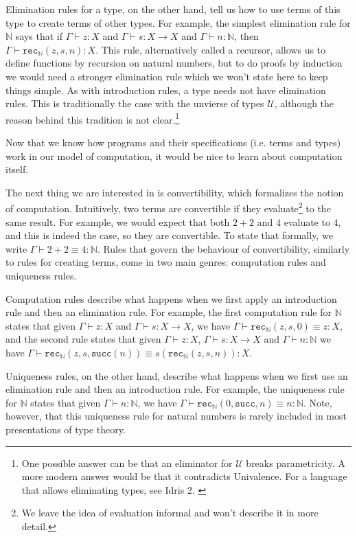 \documentclass[declaration,mgr,english,shortabstract]{iithesis}
\newcommand{\m}[1]{\texttt{#1}}
\newcommand{\term}[3]{#1 \vdash #2 : #3}
\newcommand{\termconv}[4]{#1 \vdash #2 \equiv #3 : #4}
\newcommand{\N}{\mathbb{N}}
\newcommand{\suc}[1]{\m{succ}(#1)}
\newcommand{\recN}[3]{\m{rec}_\N(#1, #2, #3)}
\begin{document}
Elimination rules for a type, on the other hand, tell us how to use terms of this type to create terms of other types. For example, the simplest elimination rule for $\N$ says that if $\term{\Gamma}{z}{X}$ and $\term{\Gamma}{s}{X \to X}$ and $\term{\Gamma}{n}{\N}$, then $\term{\Gamma}{\recN{z}{s}{n}}{X}$. This rule, alternatively called a recursor, allows us to define functions by recursion on natural numbers, but to do proofs by induction we would need a stronger elimination rule which we won't state here to keep things simple. As with introduction rules, a type needs not have elimination rules. This is traditionally the case with the unvierse of types $\mathcal{U}$, although the reason behind this tradition is not clear.\footnote{One possible answer can be that an eliminator for $\mathcal{U}$ breaks parametricity. A more modern answer would be that it contradicts Univalence. \cite{HoTTBlog} For a language that allows eliminating types, see Idris 2. \cite{Idris2}}

\label{convertible}

Now that we know how programs and their specifications (i.e. terms and types) work in our model of computation, it would be nice to learn about computation itself.

The next thing we are interested in is convertibility, which formalizes the notion of computation. Intuitively, two terms are convertible if they evaluate\footnote{We leave the idea of evaluation informal and won't describe it in more detail.} to the same result. For example, we would expect that both $2 + 2$ and $4$ evaluate to $4$, and this is indeed the case, so they are convertible. To state that formally, we write $\termconv{\Gamma}{2 + 2}{4}{\N}$. Rules that govern the behaviour of convertibility, similarly to rules for creating terms, come in two main genres: computation rules and uniqueness rules.

Computation rules describe what happens when we first apply an introduction rule and then an elimination rule. For example, the first computation rule for $\N$ states that given $\term{\Gamma}{z}{X}$ and $\term{\Gamma}{s}{X \to X}$, we have $\termconv{\Gamma}{\recN{z}{s}{0}}{z}{X}$, and the second rule states that given $\term{\Gamma}{z}{X}$, $\term{\Gamma}{s}{X \to X}$ and $\term{\Gamma}{n}{\N}$ we have $\termconv{\Gamma}{\recN{z}{s}{\suc{n}}}{s(\recN{z}{s}{n})}{X}$.

Uniqueness rules, on the other hand, describe what happens when we first use an elimination rule and then an introduction rule. For example, the uniqueness rule for $\N$ states that given $\term{\Gamma}{n}{\N}$, we have $\termconv{\Gamma}{\recN{0}{\m{succ}}{n}}{n}{\N}$. Note, however, that this uniqueness rule for natural numbers is rarely included in most presentations of type theory.
\end{document}
